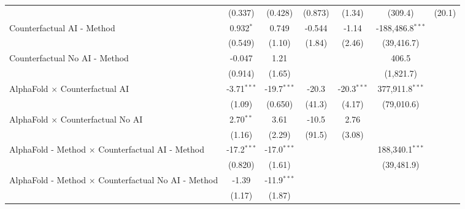 \begin{tabular}{lcccccc}
                                                              & (0.337)       & (0.428)       & (0.873)    & (1.34)        & (309.4)                  & (20.1)\\   
   Counterfactual AI - Method                                 & 0.932$^{*}$   & 0.749         & -0.544     & -1.14         & -188,486.8$^{***}$       &   \\   
                                                              & (0.549)       & (1.10)        & (1.84)     & (2.46)        & (39,416.7)               &   \\   
   Counterfactual No AI - Method                              & -0.047        & 1.21          &            &               & 406.5                    &   \\   
                                                              & (0.914)       & (1.65)        &            &               & (1,821.7)                &   \\   
   AlphaFold $\times$ Counterfactual AI                       & -3.71$^{***}$ & -19.7$^{***}$ & -20.3      & -20.3$^{***}$ & 377,911.8$^{***}$        &   \\   
                                                              & (1.09)        & (0.650)       & (41.3)     & (4.17)        & (79,010.6)               &   \\   
   AlphaFold $\times$ Counterfactual No AI                    & 2.70$^{**}$   & 3.61          & -10.5      & 2.76          &                          &   \\   
                                                              & (1.16)        & (2.29)        & (91.5)     & (3.08)        &                          &   \\   
   AlphaFold - Method $\times$ Counterfactual AI - Method     & -17.2$^{***}$ & -17.0$^{***}$ &            &               & 188,340.1$^{***}$        &   \\   
                                                              & (0.820)       & (1.61)        &            &               & (39,481.9)               &   \\   
   AlphaFold - Method $\times$ Counterfactual No AI - Method  & -1.39         & -11.9$^{***}$ &            &               &                          &   \\   
                                                              & (1.17)        & (1.87)        &            &               &                          &   \\   

\end{tabular}
